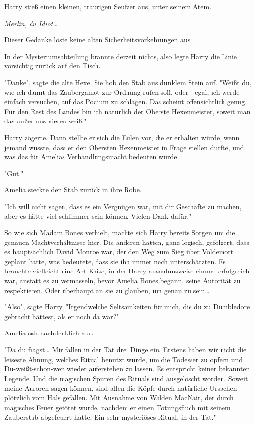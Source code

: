 {Harry stieß einen kleinen, traurigen Seufzer aus, unter seinem Atem.

\emph{Merlin, du Idiot…}

Dieser Gedanke löste keine alten Sicherheitsvorkehrungen aus.

In der Mysteriumsabteilung brannte derzeit nichts, also legte Harry die Linie vorsichtig zurück auf den Tisch.

"Danke", sagte die alte Hexe. Sie hob den Stab aus dunklem Stein auf. "Weißt du, wie ich damit das Zaubergamot zur Ordnung rufen soll, oder - egal, ich werde einfach versuchen, auf das Podium zu schlagen. Das scheint offensichtlich genug. Für den Rest des Landes bin ich natürlich der Oberste Hexenmeister, soweit man das außer uns vieren weiß."

Harry zögerte. Dann stellte er sich die Eulen vor, die er erhalten würde, wenn jemand wüsste, dass er den Obersten Hexenmeister in Frage stellen durfte, und was das für Amelias Verhandlungsmacht bedeuten würde.

"Gut."

Amelia steckte den Stab zurück in ihre Robe.

"Ich will nicht sagen, dass es ein Vergnügen war, mit dir Geschäfte zu machen, aber es hätte viel schlimmer sein können. Vielen Dank dafür."

So wie sich Madam Bones verhielt, machte sich Harry bereits Sorgen um die genauen Machtverhältnisse hier. Die anderen hatten, ganz logisch, gefolgert, dass es hauptsächlich David Monroe war, der den Weg zum Sieg über Voldemort geplant hatte, was bedeutete, dass sie ihn immer noch unterschätzten. Es brauchte vielleicht eine Art Krise, in der Harry ausnahmsweise einmal erfolgreich war, anstatt es zu vermasseln, bevor Amelia Bones begann, seine Autorität zu respektieren. Oder überhaupt an sie zu glauben, um genau zu sein…

"Also", sagte Harry. "Irgendwelche Seltsamkeiten für mich, die du zu Dumbledore gebracht hättest, als er noch da war?"

Amelia sah nachdenklich aus.

"Da du fragst… Mir fallen in der Tat drei Dinge ein. Erstens haben wir nicht die leiseste Ahnung, welches Ritual benutzt wurde, um die Todesser zu opfern und Du-weißt-schon-wen wieder auferstehen zu lassen. Es entspricht keiner bekannten Legende. Und die magischen Spuren des Rituals sind ausgelöscht worden. Soweit meine Auroren sagen können, sind allen die Köpfe durch natürliche Ursachen plötzlich vom Hals gefallen. Mit Ausnahme von Walden MacNair, der durch magisches Feuer getötet wurde, nachdem er einen Tötungsfluch mit seinem Zauberstab abgefeuert hatte. Ein sehr mysteriöses Ritual, in der Tat."

}
